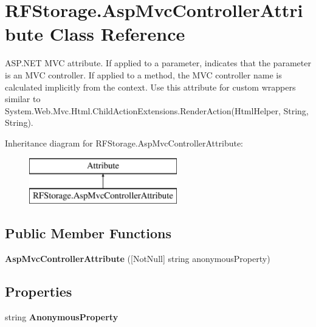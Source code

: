 \hypertarget{class_r_f_storage_1_1_asp_mvc_controller_attribute}{}\section{R\+F\+Storage.\+Asp\+Mvc\+Controller\+Attribute Class Reference}
\label{class_r_f_storage_1_1_asp_mvc_controller_attribute}


A\+S\+P.\+N\+ET M\+VC attribute. If applied to a parameter, indicates that the parameter is an M\+VC controller. If applied to a method, the M\+VC controller name is calculated implicitly from the context. Use this attribute for custom wrappers similar to {\ttfamily System.\+Web.\+Mvc.\+Html.\+Child\+Action\+Extensions.\+Render\+Action(\+Html\+Helper, String, String)}.  


Inheritance diagram for R\+F\+Storage.\+Asp\+Mvc\+Controller\+Attribute\+:\begin{figure}[H]
\begin{center}
\leavevmode
\includegraphics[height=2.000000cm]{class_r_f_storage_1_1_asp_mvc_controller_attribute}
\end{center}
\end{figure}
\subsection*{Public Member Functions}
\begin{DoxyCompactItemize}
\item 
\mbox{\label{class_r_f_storage_1_1_asp_mvc_controller_attribute_a1c0328c91b4d4dc9f9bdd2b2ce97d97e}} 
{\bfseries Asp\+Mvc\+Controller\+Attribute} (\mbox{[}Not\+Null\mbox{]} string anonymous\+Property)
\end{DoxyCompactItemize}
\subsection*{Properties}
\begin{DoxyCompactItemize}
\item 
\mbox{\label{class_r_f_storage_1_1_asp_mvc_controller_attribute_a72c379ac339e80e412743eb6018dc811}} 
string {\bfseries Anonymous\+Property}
\end{DoxyCompactItemize}


